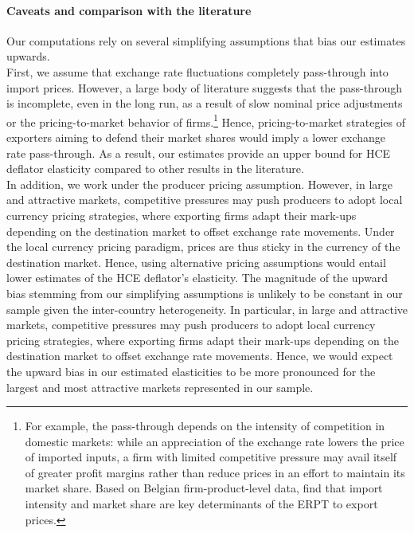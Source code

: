 \documentclass[11pt,a4paper]{paper} %
\begin{document}
\paragraph{Caveats and comparison with the literature}
Our computations rely on several simplifying assumptions that bias our estimates upwards.\\
First, we assume that exchange rate fluctuations completely pass-through into import prices. 
However, a large body of literature suggests that the pass-through is incomplete, even in the long run, as a
result of slow nominal price adjustments or the pricing-to-market behavior of firms.\footnote{For example, the pass-through depends on the intensity
of competition in domestic markets: while an appreciation of the exchange rate lowers the price of imported inputs, a firm with limited competitive pressure may avail itself of greater profit margins rather than reduce prices in an effort to maintain its market share. Based on Belgian firm-product-level data, \cite{Amiti2014} find that import intensity and market share are key determinants of the ERPT to export prices.} 
Hence, pricing-to-market strategies of exporters aiming to defend their market shares would imply a lower exchange rate pass-through. 
As a result, our estimates provide an upper bound for HCE deflator elasticity compared to other results in the literature.\\
In addition, we work under the producer pricing assumption. 
However, in large and attractive markets, competitive pressures may push producers to adopt local currency pricing strategies,
where exporting firms adapt their mark-ups depending on the destination market to offset exchange rate movements. 
Under the local currency pricing paradigm, prices are thus sticky in the currency of the destination market. 
Hence, using alternative pricing assumptions would entail lower estimates of the HCE deflator's elasticity.
The magnitude of the upward bias stemming from our simplifying assumptions is unlikely to be constant in our sample given the inter-country heterogeneity.
In particular, in large and attractive markets, competitive pressures may push producers to adopt local currency pricing strategies, where exporting firms adapt their mark-ups depending on the destination market to offset exchange rate movements. 
Hence, we would expect the upward bias in our estimated elasticities to be more pronounced for the largest and most attractive markets represented in our sample.\\
\end{document}
